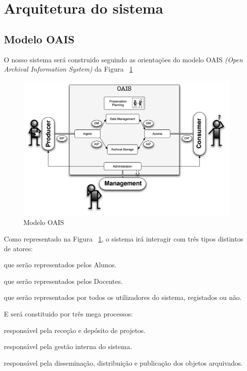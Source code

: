 \section{Arquitetura do sistema}
\subsection{Modelo OAIS}
O nosso sistema será construido seguindo as orientações do modelo OAIS \textit{(Open Archival Information System)} da Figura ~\ref{fig:oais}

\begin{figure}[H] 
  \centering
  \includegraphics[width=1\textwidth,center]{images/arquitetura/oais}
  \caption{Modelo OAIS}
  \label{fig:oais}
\end{figure}

Como representado na Figura ~\ref{fig:oais}, o sistema irá interagir com três tipos distintos de atores:
\begin{description}[labelindent=1cm]
  \item[Produtores] que serão representados pelos Alunos.
  \item[Administrador] que serão representados pelos Docentes.
  \item[Consumidor] que serão representados por todos os utilizadores do sistema, registados ou não.
\end{description}
E será constituido por três mega processos:
\begin{description}[labelindent=1cm]
  \item[Ingestão] responsável pela receção e depósito de projetos.
  \item[Administração] responsável pela gestão interna do sistema.
  \item[Disseminação] responsável pela disseminação, distribuição e publicação dos objetos arquivados.
\end{description}

